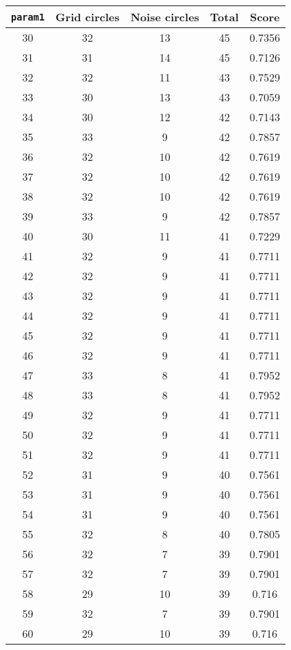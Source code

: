 \documentclass[letterpaper, 12pt]{article}
\begin{document}
\begin{longtable}{|c|c|c|c|c|}
\hline
\textbf{\texttt{param1}} & \textbf{Grid circles} & \textbf{Noise circles} & \textbf{Total} & \textbf{Score} \\
\hline
30 & 32 & 13 & 45 & 0.7356 \\
\hline
31 & 31 & 14 & 45 & 0.7126 \\
\hline
32 & 32 & 11 & 43 & 0.7529 \\
\hline
33 & 30 & 13 & 43 & 0.7059 \\
\hline
34 & 30 & 12 & 42 & 0.7143 \\
\hline
35 & 33 & 9 & 42 & 0.7857 \\
\hline
36 & 32 & 10 & 42 & 0.7619 \\
\hline
37 & 32 & 10 & 42 & 0.7619 \\
\hline
38 & 32 & 10 & 42 & 0.7619 \\
\hline
39 & 33 & 9 & 42 & 0.7857 \\
\hline
40 & 30 & 11 & 41 & 0.7229 \\
\hline
41 & 32 & 9 & 41 & 0.7711 \\
\hline
42 & 32 & 9 & 41 & 0.7711 \\
\hline
43 & 32 & 9 & 41 & 0.7711 \\
\hline
44 & 32 & 9 & 41 & 0.7711 \\
\hline
45 & 32 & 9 & 41 & 0.7711 \\
\hline
46 & 32 & 9 & 41 & 0.7711 \\
\hline
47 & 33 & 8 & 41 & 0.7952 \\
\hline
48 & 33 & 8 & 41 & 0.7952 \\
\hline
49 & 32 & 9 & 41 & 0.7711 \\
\hline
50 & 32 & 9 & 41 & 0.7711 \\
\hline
51 & 32 & 9 & 41 & 0.7711 \\
\hline
52 & 31 & 9 & 40 & 0.7561 \\
\hline
53 & 31 & 9 & 40 & 0.7561 \\
\hline
54 & 31 & 9 & 40 & 0.7561 \\
\hline
55 & 32 & 8 & 40 & 0.7805 \\
\hline
56 & 32 & 7 & 39 & 0.7901 \\
\hline
57 & 32 & 7 & 39 & 0.7901 \\
\hline
58 & 29 & 10 & 39 & 0.716 \\
\hline
59 & 32 & 7 & 39 & 0.7901 \\
\hline
60 & 29 & 10 & 39 & 0.716 \\
\hline

\end{longtable}
\end{document}
